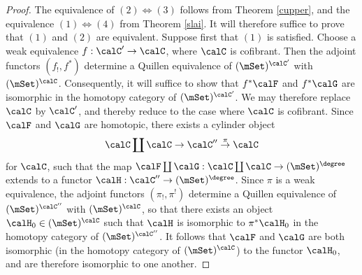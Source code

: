 \begin{proof}
The equivalence of $(2) \Leftrightarrow (3)$ follows from Theorem \ref{cupper}, and
the equivalence $(1) \Leftrightarrow (4)$ from Theorem \ref{slai}. It will therefore suffice to
prove that $(1)$ and $(2)$ are equivalent. Suppose first that $(1)$ is satisfied.
Choose a weak equivalence $f: \calC' \rightarrow \calC$, where $\calC$ is cofibrant. 
Then the adjoint functors $(f_!, f^{\ast})$ determine a Quillen equivalence of
$(\mSet)^{\calC'}$ with $(\mSet)^{\calC}$. Consequently, it will suffice to show that
$f^{\ast} \calF$ and $f^{\ast} \calG$ are isomorphic in the homotopy category of
$(\mSet)^{\calC'}$. We may therefore replace $\calC$ by $\calC'$, and thereby reduce to the case where $\calC$ is cofibrant. Since $\calF$ and $\calG$ are homotopic, there exists a cylinder object
$$ \calC \coprod \calC \rightarrow \calC'' \stackrel{\pi}{\rightarrow} \calC$$
for $\calC$, such that the map $\calF \coprod \calG: \calC \coprod \calC \rightarrow (\mSet)^{\degree}$ extends to a functor $\calH: \calC'' \rightarrow (\mSet)^{\degree}$. Since $\pi$ is a weak equivalence, the adjoint functors $(\pi_{!}, \pi^{!})$ determine a Quillen equivalence of
$(\mSet)^{\calC''}$ with $(\mSet)^{\calC}$, so that there exists an object
$\calH_0 \in (\mSet)^{\calC}$ such that $\calH$ is isomorphic to $\pi^{\ast} \calH_0$
in the homotopy category of $(\mSet)^{\calC''}$. It follows that $\calF$ and $\calG$ are both
isomorphic (in the homotopy category of $(\mSet)^{\calC}$) to the functor $\calH_0$, and are therefore isomorphic to one another.


\end{proof}
